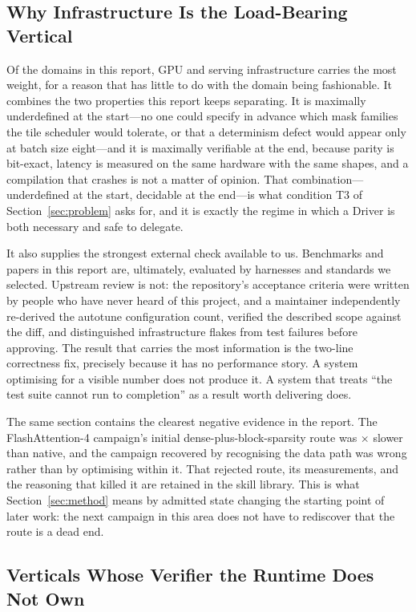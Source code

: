 \subsection{Why Infrastructure Is the Load-Bearing Vertical}

Of the domains in this report, GPU and serving infrastructure carries the most
weight, for a reason that has little to do with the domain being fashionable. It
combines the two properties this report keeps separating. It is maximally
underdefined at the start---no one could specify in advance which mask families the
tile scheduler would tolerate, or that a determinism defect would appear only at
batch size eight---and it is maximally verifiable at the end, because parity is
bit-exact, latency is measured on the same hardware with the same shapes, and a
compilation that crashes is not a matter of opinion. That combination---underdefined
at the start, decidable at the end---is what condition T3 of
Section~\ref{sec:problem} asks for, and it is exactly the regime in which a Driver is
both necessary and safe to delegate.

It also supplies the strongest external check available to us. Benchmarks and papers
in this report are, ultimately, evaluated by harnesses and standards we selected.
Upstream review is not: the repository's acceptance criteria were written by people
who have never heard of this project, and a maintainer independently re-derived the
autotune configuration count, verified the described scope against the diff, and
distinguished infrastructure flakes from test failures before approving. The result
that carries the most information is the two-line correctness fix, precisely because
it has no performance story. A system optimising for a visible number does not
produce it. A system that treats ``the test suite cannot run to completion'' as a
result worth delivering does.

The same section contains the clearest negative evidence in the report. The
FlashAttention-4 campaign's initial dense-plus-block-sparsity route was
\FlashDAWorstRoute$\times$ slower than native, and the campaign recovered by
recognising the data path was wrong rather than by optimising within it. That
rejected route, its measurements, and the reasoning that killed it are retained in
the skill library. This is what Section~\ref{sec:method} means by admitted state
changing the starting point of later work: the next campaign in this area does not
have to rediscover that the route is a dead end.

\subsection{Verticals Whose Verifier the Runtime Does Not Own}

